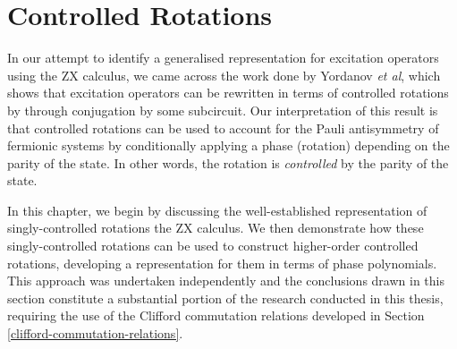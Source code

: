 \chapter{Controlled Rotations}%
\label{controlled-rotations}

In our attempt to identify a generalised representation for excitation operators using the ZX calculus, we came across the work done by Yordanov \textit{et al}, which shows that excitation operators can be rewritten in terms of controlled rotations by through conjugation by some subcircuit. Our interpretation of this result is that controlled rotations can be used to account for the Pauli antisymmetry of fermionic systems by conditionally applying a phase (rotation) depending on the parity of the state. In other words, the rotation is \textit{controlled} by the parity of the state.

In this chapter, we begin by discussing the well-established representation of singly-controlled rotations the ZX calculus. We then demonstrate how these singly-controlled rotations can be used to construct higher-order controlled rotations, developing a representation for them in terms of phase polynomials. This approach was undertaken independently and the conclusions drawn in this section constitute a substantial portion of the research conducted in this thesis, requiring the use of the Clifford commutation relations developed in Section \ref{clifford-commutation-relations}.
